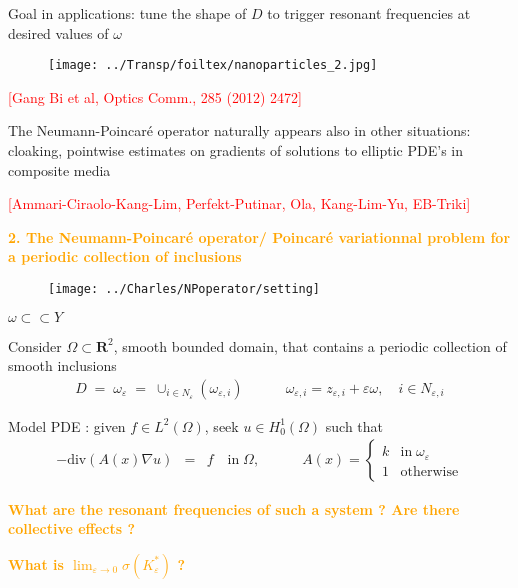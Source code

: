 \documentclass[mathserif,9pt]{beamer}
\def\e{{\varepsilon}}
\def\R{\mathbf R}
\begin{document}
\begin{frame}
\small{


Goal in applications: tune the shape of $D$ to trigger 
resonant frequencies at desired values of $\omega$

\begin{figure}[hbt]
\texttt{[image: ../Transp/foiltex/nanoparticles\_2.jpg]}
\end{figure}
\textcolor{red}{[Gang Bi et al, Optics Comm., 285 (2012) 2472]}
\bigskip

The Neumann-Poincar\'e operator naturally appears also in other 
situations: cloaking, pointwise estimates on gradients of solutions to elliptic PDE's
in composite media
\medskip

\textcolor{red}{[Ammari-Ciraolo-Kang-Lim, Perfekt-Putinar, Ola, Kang-Lim-Yu, EB-Triki]}


}
\end{frame}
\begin{frame}
\small{


\textcolor{orange}{\Large{\bf 2. The Neumann-Poincar\'e operator/
Poincar\'e variationnal problem
for a periodic collection of inclusions}}

\begin{figure}[hbt]
\texttt{[image: ../Charles/NPoperator/setting]}
\end{figure}

\vspace*{-14mm}
\hspace*{80mm}$\omega \subset\subset Y$
\vspace*{14mm}

Consider $\Omega \subset \R^2$, smooth bounded domain, that contains
a periodic collection of smooth inclusions 
\textcolor{ox}{
\begin{eqnarray*}
D \;=\; \omega_\e \;=\; \cup_{i \in N_\e} (\omega_{\e,i})
\quad\quad\quad
\omega_{\e,i} = z_{\e,i} + \e \omega, \quad i \in N_{\e,i}
\end{eqnarray*}}
\medskip

Model PDE : given $f \in L^2(\Omega)$, seek $u \in H^1_0(\Omega)$ such that
\textcolor{ox}{
\begin{eqnarray*}
-\textrm{div}(A(x) \nabla u) &=& f \quad \textrm{in}\; \Omega,
\quad\quad\quad
A(x) =
\left\{ \begin{array}{ll}
k & \textrm{in}\; \omega_\e
\\
1 & \textrm{otherwise}
\end{array} \right.
\end{eqnarray*}}


\textcolor{orange}{\bf What are the resonant frequencies of such a system ?
Are there collective effects ?}
\medskip

\textcolor{orange}{\bf What is $\lim_{\e \to 0} \sigma(K^*_\e)$ ?}


}
\end{frame}
\end{document}
